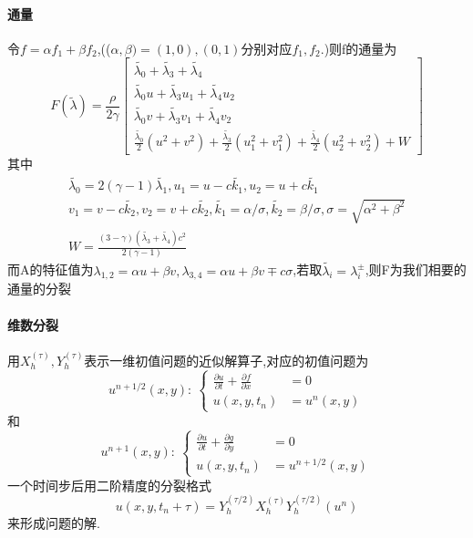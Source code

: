 \documentclass[UTF8]{ctexart}
\begin{document}
  \paragraph{通量}
  令$f=\alpha f_1 +\beta f_2$,(($\alpha,\beta)=(1,0),(0,1)$分别对应$f_1,f_2.$)则f的通量为
  \begin{equation*}
    F(\tilde{\lambda})=\frac{\rho}{2\gamma}\left[\begin{matrix}
                                             \tilde{\lambda_0}+\tilde{\lambda_3}+\tilde{\lambda_4} \\
                                             \tilde{\lambda_0}u+ \tilde{\lambda_3}u_1+ \tilde{\lambda_4}u_2 \\
                                             \tilde{\lambda_0}v+ \tilde{\lambda_3}v_1+ \tilde{\lambda_4}v_2\\
                                             \frac{\tilde{\lambda_0}}{2}(u^2+v^2) + \frac{\tilde{\lambda_3}}{2}(u_1^2+v_1^2) + \frac{\tilde{\lambda_4}}{2}(u_2^2+v_2^2) +W
                                           \end{matrix}\right]
  \end{equation*}
  其中
  \begin{equation*}
    \begin{matrix}
    \tilde{\lambda_0}=2(\gamma-1)\tilde{\lambda_1},u_1=u-c\tilde{k_1},u_2=u+c\tilde{k_1} \\
    v_1=v-c\tilde{k_2},v_2=v+c\tilde{k_2},\tilde{k_1}=\alpha/\sigma,\tilde{k_2}=\beta/\sigma,\sigma=\sqrt{\alpha^2+\beta^2} \\
    W = \frac{(3-\gamma)(\tilde{\lambda_3}+\tilde{\lambda_4})c^2}{2(\gamma-1)}
   \end{matrix}
  \end{equation*}
  而A的特征值为$\lambda_{1,2}=\alpha u + \beta v, \lambda_{3,4}=\alpha u + \beta v \mp c \sigma $,若取$\tilde{\lambda_i}=\lambda_i^{\pm}$,则F为我们相要的通量的分裂
\paragraph{维数分裂}
    用$X_h^{(\tau)},Y_h^{(\tau)}$表示一维初值问题的近似解算子,对应的初值问题为
    \begin{equation*}
      u^{n+1/2}(x,y):\ \left\{ \begin{split}
                                 \frac{\partial u}{\partial t} +\frac{\partial f}{\partial x}& =0 \\
                                 u(x,y,t_n) & =u^n(x,y)
                               \end{split}\right.
    \end{equation*}
    和
 \begin{equation*}
      u^{n+1}(x,y):\ \left\{ \begin{split}
                                 \frac{\partial u}{\partial t} +\frac{\partial g}{\partial y}& =0 \\
                                 u(x,y,t_n) & =u^{n+1/2}(x,y)
                               \end{split}\right.
    \end{equation*}
    一个时间步后用二阶精度的分裂格式
    $$
    u(x,y,t_n+\tau)=Y_h^{(\tau/2)}X_h^{(\tau)}Y_h^{(\tau/2)}(u^n)
    $$
    来形成问题的解.
\end{document}

